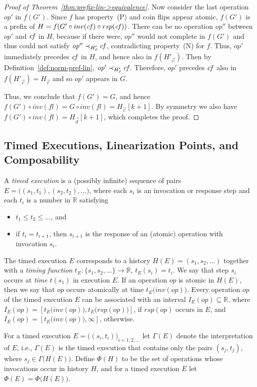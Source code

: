 \documentclass[11pt,letterpaper]{article}
\newcommand{\vc}{{\vec{c}}}
\newcommand{\vd}{{\vec{d}}}
\newcommand{\op}{\ensuremath{\mathit{op}}}
\newcommand{\inv}[1]{\ensuremath{inv(#1)}}
\newcommand{\rsp}[1]{\ensuremath{rsp(#1)}}
\begin{document}
\begin{proof}[Proof of Theorem~\ref{thm:prefix-lin->equivalence}]
  Now consider the last operation $\op'$ in $f(G')$.
  Since $f$ has property~(P)
  and coin flips appear atomic,
  $f(G')$ is a prefix of $H = f(G'\circ \inv{\fl} \circ \rsp{\fl} )$.
  There can be no operation $\op''$ between $\op'$ and $\mathit{cf}$ in $H$, because if there were, $\op''$ would not complete in  $f(G')$
  and thus could not satisfy $\op''\prec_{H'_\vc} \fl$, contradicting property~(N) for $f$.
  Thus, $\op'$ immediately precedes $\mathit{cf}$ in $H$, and hence also in $f(H'_\vc)$.
  Then by Definition~\ref{def:norm-pref-lin}, $\op'\prec_{H'_\vc} \fl$.
  Therefore, $\op'$ precedes $\mathit{cf}$ also in $f(H'_\vc)=H_\vc$ and so $\op'$ appears in $G$.

Thus, we conclude that $f(G')=G$, and hence $f(G') \circ \inv{fl} = G \circ \inv{fl}  = H_\vc[k+1]$.
By symmetry we also have $ f(G') \circ \inv{fl}  = H_\vd[k+1] $, which completes the proof.
\end{proof}



\subsection{Timed Executions, Linearization Points, and Composability}\label{sec:timed}
A \emph{timed execution} is a (possibly infinite) sequence of pairs $E=\bigl((s_1,t_1),(s_2,t_2),\dots\bigr)$, where each $s_i$ is an invocation or response step and each $t_i$ is a number in $\mathds{R}$ satisfying
\begin{itemize}
\item $t_1\leq t_2\leq\dots$, and
\item if $t_i=t_{i+1}$, then $s_{i+1}$ is the response of an (atomic) operation with invocation $s_i$.
\end{itemize}
The timed execution $E$ corresponds to a history $H(E)=(s_1,s_2,\dots)$ together with a \emph{timing function} $t_E:\{s_1,s_2,\dots\}\to\mathds{R}$, $t_E(s_i)=t_i$.
We say that step $s_i$ occurs at \emph{time $t(s_1)$} in execution $E$.
If an operation $op$ is atomic in $H(E)$, then we say that $op$ occurs atomically at time $t_E\bigl(inv(op)\bigr)$.
Every operation $op$ of the timed execution $E$ can be associated with an interval $I_E(op)\subseteq\mathds{R}$, where $I_E(op)=\left[t_E\bigl(inv(op)\bigr),t_E\bigl(rsp(op)\bigr)\right]$, if $rsp(op)$ occurs in $E$, and $I_E(op)=\left[t_E\bigl(inv(op)\bigr),\infty\right]$, otherwise.

For a timed execution $E=\bigl((s_i,t_i)\bigr)_{i=1,2,\dots}$ let $\Gamma(E)$ denote the interpretation of $E$, i.e., $\Gamma(E)$ is the timed execution that contains only the pairs $(s_j,t_j)$, where $s_j\in\Gamma\bigl(H(E)\bigr)$.
Define $\Phi(H)$ to be the set of operations whose invocations occur in history $H$, and for a timed execution $E$ let $\Phi(E)=\Phi\bigl(H(E)\bigr)$.
\end{document}
